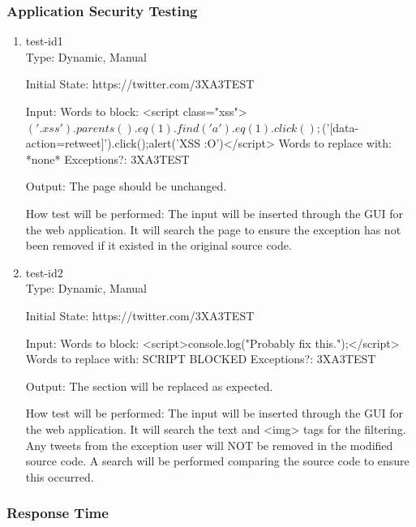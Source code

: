 \documentclass[12pt, titlepage]{article}
\begin{document}
\subsubsection{Application Security Testing}
\begin{enumerate}
\item{test-id1\\}
Type: Dynamic, Manual
					
Initial State: https://twitter.com/3XA3TEST
					
Input: Words to block: <script class="xss">$('.xss').parents().eq(1).find('a').eq(1).click();$('[data-action=retweet]').click();alert('XSS :O')</script>
Words to replace with: *none*
Exceptions?: 3XA3TEST
					
Output: The page should be unchanged.
					
How test will be performed: The input will be inserted through the GUI for the web application. It will search the page to ensure the exception has not been removed if it existed in the original source code.
					
\item{test-id2\\}
Type: Dynamic, Manual
					
Initial State: https://twitter.com/3XA3TEST
					
Input:  Words to block: <script>console.log("Probably fix this.");</script>
Words to replace with: SCRIPT BLOCKED
Exceptions?: 3XA3TEST
					
Output: The section will be replaced as expected. 

How test will be performed: The input will be inserted through the GUI for the web application. It will search the text and <img> tags for the filtering. Any tweets from the exception user will NOT be removed in the modified source code. A search will be performed comparing the source code to ensure this occurred.
\end{enumerate}
\subsubsection{Response Time}
		
\end{document}
